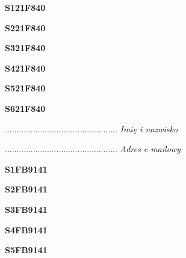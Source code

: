 \begin{turn}{90}\huge \textbf{S121F840}\end{turn}

\begin{turn}{90}\huge \textbf{S221F840}\end{turn}

\begin{turn}{90}\huge \textbf{S321F840}\end{turn}

\begin{turn}{90}\huge \textbf{S421F840}\end{turn}

\begin{turn}{90}\huge \textbf{S521F840}\end{turn}

\begin{turn}{90}\huge \textbf{S621F840}\end{turn}

\begin{turn}{90}\begin{minipage}{\linewidth} \vspace{20mm} ................................................  \textit{Imię i nazwisko}\end{minipage}\end{turn}

\begin{turn}{90}\begin{minipage}{\linewidth} \vspace{20mm} ................................................  \textit{Adres e-mailowy}\end{minipage}\end{turn}

\begin{turn}{90}\huge \textbf{S1FB9141}\end{turn}

\begin{turn}{90}\huge \textbf{S2FB9141}\end{turn}

\begin{turn}{90}\huge \textbf{S3FB9141}\end{turn}

\begin{turn}{90}\huge \textbf{S4FB9141}\end{turn}

\begin{turn}{90}\huge \textbf{S5FB9141}\end{turn}

